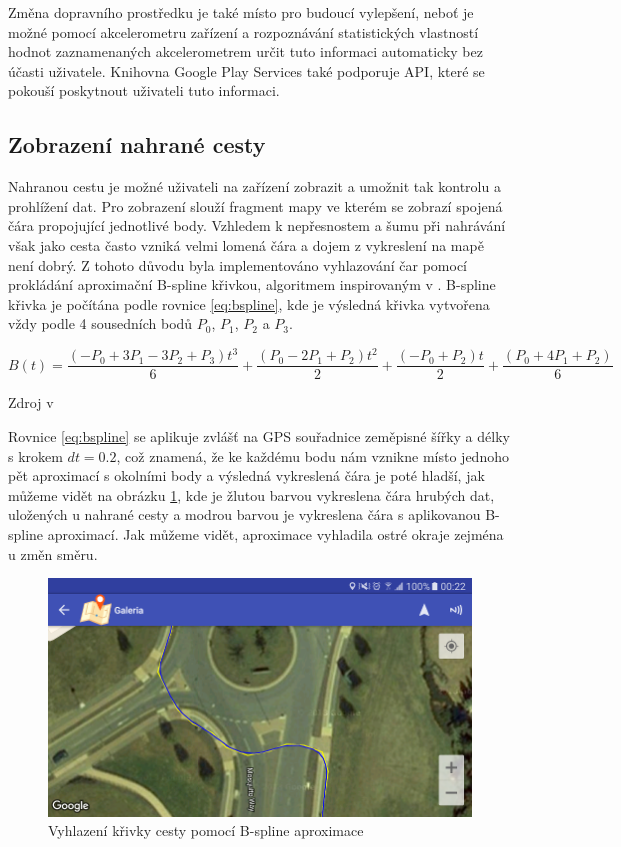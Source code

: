 \documentclass[czech,master,public,dept460,male,java,cpdeclaration]{diploma}
\begin{document}
Změna dopravního prostředku je také místo pro budoucí vylepšení, neboť je možné pomocí akcelerometru
zařízení a rozpoznávání statistických vlastností hodnot zaznamenaných akcelerometrem určit tuto informaci
automaticky bez účasti uživatele. Knihovna Google Play Services také podporuje API, které se pokouší
poskytnout uživateli tuto informaci.


\subsection{Zobrazení nahrané cesty}
Nahranou cestu je možné uživateli na zařízení zobrazit a umožnit tak kontrolu a prohlížení dat.
Pro zobrazení slouží fragment mapy ve kterém se zobrazí spojená čára propojující jednotlivé body.
Vzhledem k nepřesnostem a šumu při nahrávání však jako cesta často vzniká velmi lomená čára a dojem z vykreslení
na mapě není dobrý. Z tohoto důvodu byla implementováno vyhlazování čar pomocí prokládání aproximační
B-spline křivkou, algoritmem inspirovaným v \cite{bspline}. B-spline křivka je počítána podle
rovnice \ref{eq:bspline}, kde je výsledná křivka vytvořena vždy podle 4 sousedních bodů $P_0$, $P_1$,
$P_2$ a $P_3$.

\begin{equation}
B(t)=\frac{(-P_0 + 3P_1 - 3P_2 + P_3)t^3}{6} + \frac{(P_0 - 2P_1 + P_2)t^2}{2} + \frac{(-P_0 + P_2)t}{2} + \frac{(P_0 + 4P_1 + P_2)}{6}
\label{eq:bspline}
\end{equation}
\centerline{Zdroj v \cite{bspline}}
\vspace{0.2cm}


Rovnice \ref{eq:bspline} se aplikuje zvlášť na GPS souřadnice zeměpisné šířky a délky s krokem $dt = 0.2$,
 což znamená, že ke každému bodu nám vznikne místo jednoho pět aproximací s okolními body a výsledná
 vykreslená čára je poté hladší, jak můžeme vidět na obrázku \ref{fig:splinediff}, kde je žlutou barvou
 vykreslena čára hrubých dat, uložených u nahrané cesty a modrou barvou je vykreslena čára s aplikovanou
 B-spline aproximací. Jak můžeme vidět, aproximace vyhladila ostré okraje zejména u změn směru.

\begin{figure}[H]
        \centering
                \includegraphics[scale=0.3]{img/screen/bsplineapplied.png}
        \caption{Vyhlazení křivky cesty pomocí B-spline aproximace}
        \label{fig:splinediff}
\end{figure}
\end{document}

